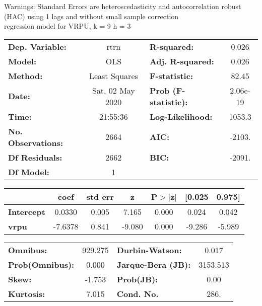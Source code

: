 Warnings: \newline
 [1] Standard Errors are heteroscedasticity and autocorrelation robust (HAC) using 1 lags and without small sample correction\\ 

regression model for VRPU, k = 9 h = 3\begin{center}
\begin{tabular}{lclc}
\toprule
\textbf{Dep. Variable:}    &       rtrn       & \textbf{  R-squared:         } &     0.026   \\
\textbf{Model:}            &       OLS        & \textbf{  Adj. R-squared:    } &     0.026   \\
\textbf{Method:}           &  Least Squares   & \textbf{  F-statistic:       } &     82.45   \\
\textbf{Date:}             & Sat, 02 May 2020 & \textbf{  Prob (F-statistic):} &  2.06e-19   \\
\textbf{Time:}             &     21:55:36     & \textbf{  Log-Likelihood:    } &    1053.3   \\
\textbf{No. Observations:} &        2664      & \textbf{  AIC:               } &    -2103.   \\
\textbf{Df Residuals:}     &        2662      & \textbf{  BIC:               } &    -2091.   \\
\textbf{Df Model:}         &           1      & \textbf{                     } &             \\
\bottomrule
\end{tabular}
\begin{tabular}{lcccccc}
                   & \textbf{coef} & \textbf{std err} & \textbf{z} & \textbf{P$> |$z$|$} & \textbf{[0.025} & \textbf{0.975]}  \\
\midrule
\textbf{Intercept} &       0.0330  &        0.005     &     7.165  &         0.000        &        0.024    &        0.042     \\
\textbf{vrpu}      &      -7.6378  &        0.841     &    -9.080  &         0.000        &       -9.286    &       -5.989     \\
\bottomrule
\end{tabular}
\begin{tabular}{lclc}
\textbf{Omnibus:}       & 929.275 & \textbf{  Durbin-Watson:     } &    0.017  \\
\textbf{Prob(Omnibus):} &   0.000 & \textbf{  Jarque-Bera (JB):  } & 3153.513  \\
\textbf{Skew:}          &  -1.753 & \textbf{  Prob(JB):          } &     0.00  \\
\textbf{Kurtosis:}      &   7.015 & \textbf{  Cond. No.          } &     286.  \\
\bottomrule
\end{tabular}
\end{center}

